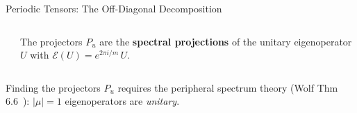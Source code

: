\documentclass[aspectratio=169,10pt]{beamer}
\begin{document}
\begin{frame}{Periodic Tensors: The Off-Diagonal Decomposition}
\begin{columns}[T]
\begin{center}
        \end{center}

        \vspace{0.1em}
        {\footnotesize The projectors $P_u$ are the
        \textbf{spectral projections}
        of the unitary eigenoperator
        $U$ with $\mathcal{E}(U) = e^{2\pi i/m}\,U$.}
    \end{columns}

    \vspace{0.15em}
    {\scriptsize\textcolor{dimwhite}{Finding the projectors $P_u$ requires
    the peripheral spectrum theory (Wolf Thm 6.6~\cite{Wolf2012Quantum}):
    $|\mu|=1$ eigenoperators are \emph{unitary}.}}
\end{frame}
\end{document}
